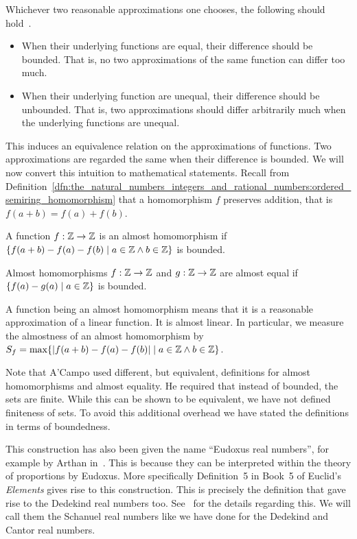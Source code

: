 \documentclass[../main.tex]{subfiles}
\begin{document}
Whichever two reasonable approximations one chooses, the following should hold~\cite{Piponi2006}.
\begin{itemize}
    \item When their underlying functions are equal, their difference should be bounded. That is, no two approximations of the same function can differ too much.
    \item When their underlying function are unequal, their difference should be unbounded. That is, two approximations should differ arbitrarily much when the underlying functions are unequal.
\end{itemize}
This induces an equivalence relation on the approximations of functions. Two approximations are regarded the same when their difference is bounded. We will now convert this intuition to mathematical statements. Recall from Definition~\ref{dfn:the_natural_numbers_integers_and_rational_numbers:ordered_semiring_homomorphism} that a homomorphism $f$ preserves addition, that is $f(a+b)=f(a)+f(b)$.
\begin{definition}
    A function $f:\mathbb{Z}\to\mathbb{Z}$ is an almost homomorphism if $\{f(a+b)-f(a)-f(b)\mid a\in\mathbb{Z}\land b\in\mathbb{Z}\}$ is bounded.
\end{definition}
\begin{definition}
    Almost homomorphisms $f:\mathbb{Z}\to\mathbb{Z}$ and $g:\mathbb{Z}\to\mathbb{Z}$ are almost equal if $\{f(a)-g(a)\mid a\in\mathbb{Z}\}$ is bounded.
\end{definition}
A function being an almost homomorphism means that it is a reasonable approximation of a linear function. It is almost linear. In particular, we measure the almostness of an almost homomorphism by $S_f=\max\{\vert f(a+b)-f(a)-f(b)\vert\mid a\in\mathbb{Z}\land b\in\mathbb{Z}\}$.

Note that A'Campo used different, but equivalent, definitions for almost homomorphisms and almost equality. He required that instead of bounded, the sets are finite. While this can be shown to be equivalent, we have not defined finiteness of sets. To avoid this additional overhead we have stated the definitions in terms of boundedness.

This construction has also been given the name ``Eudoxus real numbers'', for example by Arthan in~\cite{Arthan2004}. This is because they can be interpreted within the theory of proportions by Eudoxus. More specifically Definition~5 in Book~5 of Euclid's \textit{Elements} gives rise to this construction. This is precisely the definition that gave rise to the Dedekind real numbers too. See~\cite{Arthan2004} for the details regarding this. We will call them the Schanuel real numbers like we have done for the Dedekind and Cantor real numbers.
\end{document}
